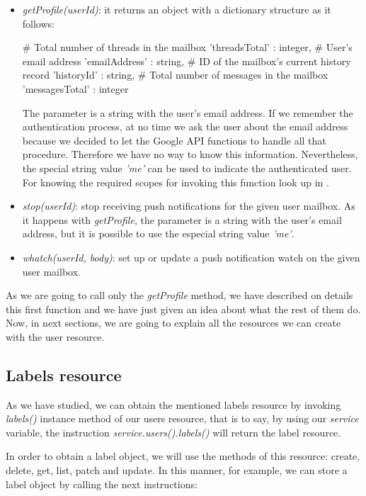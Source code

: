 \begin{itemize}
	\item\textit{getProfile(userId)}: it returns an object with a dictionary structure as it follows:
	\begin{python}
		{
			# Total number of threads in the mailbox
			'threadsTotal' : integer,
			# User's email address
			'emailAddress' : string,
			# ID of the mailbox's current history record
			'historyId' : string,
			# Total number of messages in the mailbox
			'messagesTotal' : integer
		}
	\end{python}
	The parameter is a string with the user's email address. If we remember the authentication process, at no time we ask the user about the email address because we decided to let the Google API functions to handle all that procedure. Therefore we have no way to know this information. Nevertheless, the special string value \textit{'me'} can be used to indicate the authenticated user. For knowing the required scopes for invoking this function look up in \cite[/v1/reference/users/getProfile]{gmailAPI}.
	\item\textit{stop(userId)}: stop receiving push notifications for the given user mailbox. As it happens with \textit{getProfile}, the parameter is a string with the user's email address, but it is possible to use the especial string value \textit{'me'}.
	\item\textit{whatch(userId, body)}: set up or update a push notification watch on the given user mailbox.
\end{itemize}

As we are going to call only the \textit{getProfile} method, we have described on details this first function and we have just given an idea about what the rest of them do. Now, in next sections, we are going to explain all the resources we can create with the user resource.

\subsection{Labels resource}\label{ssect:labres}
As we have studied, we can obtain the mentioned labels resource \citep[/v1/reference/users/labels]{gmailAPI} by invoking \textit{labels()} instance method of our users resource, that is to say, by using our \textit{service} variable, the instruction \textit{service.users().labels()} will return the label resource.


In order to obtain a label object, we will use the methods of this resource: create, delete, get, list, patch and update. In this manner, for example, we can store a label object by calling the next instructions:

